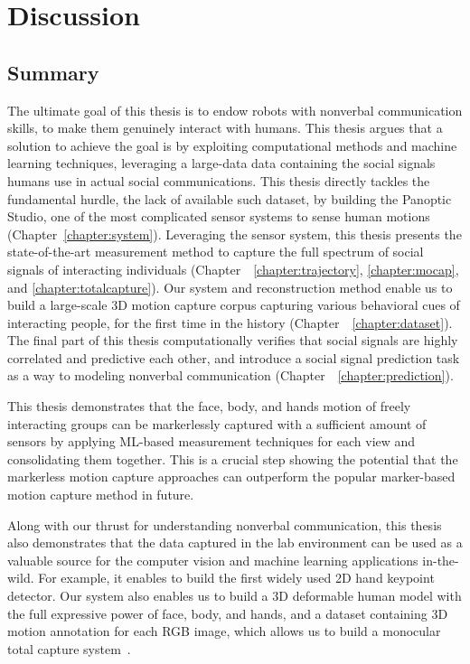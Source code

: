 \chapter{Discussion}
\label{chapter:discussion}

\section{Summary}

The ultimate goal of this thesis is to endow robots with nonverbal communication skills, to make them genuinely interact with humans. This thesis argues that a solution to achieve the goal is by exploiting computational methods and machine learning techniques, leveraging a large-data data containing the social signals humans use in actual social communications. This thesis directly tackles the fundamental hurdle, the lack of available such dataset, by building the Panoptic Studio, one of the most complicated sensor systems to sense human motions (Chapter~\ref{chapter:system}). Leveraging the sensor system, this thesis presents the state-of-the-art measurement method to capture the full spectrum of social signals of interacting individuals (Chapter~~\ref{chapter:trajectory}, \ref{chapter:mocap}, and  \ref{chapter:totalcapture}). Our system and reconstruction method enable us to build a large-scale 3D motion capture corpus capturing various behavioral cues of interacting people, for the first time in the history (Chapter~~\ref{chapter:dataset}). The final part of this thesis computationally verifies that social signals are highly correlated and predictive each other, and introduce a social signal prediction task as a way to modeling nonverbal communication (Chapter~~\ref{chapter:prediction}).

This thesis demonstrates that the face, body, and hands motion of freely interacting groups can be markerlessly captured with a sufficient amount of sensors by applying ML-based measurement techniques for each view and consolidating them together. This is a crucial step showing the potential that the markerless motion capture approaches can outperform the popular marker-based motion capture method in future. 

Along with our thrust for understanding nonverbal communication, this thesis also demonstrates that the data captured in the lab environment can be used as a valuable source for the computer vision and machine learning applications in-the-wild. For example, it enables to build the first widely used 2D hand keypoint detector\cite{simon2017hand}. Our system also enables us to build a 3D deformable human model with the full expressive power of face, body, and hands, and a dataset containing 3D motion annotation for each RGB image, which allows us to build a monocular total capture system~\cite{Xiang2019}. 

